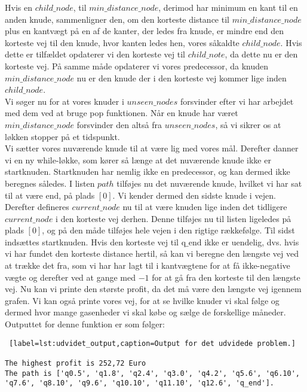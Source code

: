 Hvis en $child\_node$, til  $min\_distance\_node$, derimod har minimum en kant til en anden knude, sammenligner den, om den korteste distance til $min\_distance\_node$ plus en kantvægt på en af de kanter, der ledes fra knude, er mindre end den korteste vej til den knude, hvor kanten ledes hen, vores såkaldte $child\_node$. Hvis dette er tilfældet opdaterer vi den korteste vej til $child\_note$, da dette nu er den korteste vej. På samme måde opdaterer vi vores predecessor, da knuden $min\_distance\_node$ nu er den knude der i den korteste vej kommer lige inden $child\_node$.\\
Vi søger nu for at vores knuder i $unseen\_nodes$ forsvinder efter vi har arbejdet med dem ved at bruge pop funktionen. Når en knude har været $min\_distance\_node$ forsvinder den altså fra $unseen\_nodes$, så vi sikrer os at løkken stopper på et tidspunkt. \\
Vi sætter vores nuværende knude til at være lig med vores mål.
Derefter danner vi en ny while-løkke, som kører så længe at det nuværende knude ikke er startknuden. Startknuden har nemlig ikke en predecessor, og kan dermed ikke beregnes således. I listen $path$ tilføjes nu det nuværende knude, hvilket vi har sat til at være $\textrm{end}$, på plads $[0]$. Vi kender dermed den sidste knude i vejen. Derefter defineres $current\_node$ nu til at være knuden lige inden det tidligere $current\_node$ i den korteste vej derhen. Denne tilføjes nu til listen ligeledes på plads $[0]$, og på den måde tilføjes hele vejen i den rigtige rækkefølge. Til sidst indsættes startknuden.
Hvis den korteste vej til $\textrm{q\_end}$ ikke er uendelig, dvs. hvis vi har fundet den korteste distance hertil, så kan vi beregne den længste vej ved at trække det fra, som vi har har lagt til i kantvægtene for at få ikke-negative vægte og derefter ved at gange med $-1$ for at gå fra den korteste til den længste vej. 
Nu kan vi printe den største profit, da det må være den længste vej igennem grafen. Vi kan også printe vores vej, for at se hvilke knuder vi skal følge og dermed hvor mange gasenheder vi skal købe og sælge de forskellige måneder.
Outputtet for denne funktion er som følger:
\begin{lstlisting} [label=lst:udvidet_output,caption=Output for det udvidede problem.]

The highest profit is 252,72 Euro
The path is ['q0.5', 'q1.8', 'q2.4', 'q3.0', 'q4.2', 'q5.6', 'q6.10', 'q7.6', 'q8.10', 'q9.6', 'q10.10', 'q11.10', 'q12.6', 'q_end'].

\end{lstlisting}
